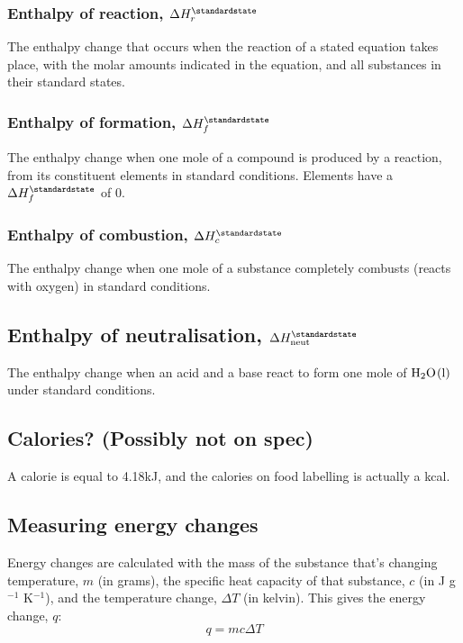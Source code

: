 \subsubsection{Enthalpy of reaction, $\Delta H^{\standardstate}_{r}$}
The enthalpy change that occurs when the reaction of a stated equation takes place, with the molar amounts indicated in the equation, and all substances in their standard states.

\subsubsection{Enthalpy of formation, $\Delta H^{\standardstate}_{f}$}
The enthalpy change when one mole of a compound is produced by a reaction, from its constituent elements in standard conditions. Elements have a $\Delta H^{\standardstate}_{f}$ of 0.

\subsubsection{Enthalpy of combustion, $\Delta H^{\standardstate}_{c}$}
The enthalpy change when one mole of a substance completely combusts (reacts with oxygen) in standard conditions.

\subsection{Enthalpy of neutralisation, $\Delta H^{\standardstate}_{\textrm{neut}}$}
The enthalpy change when an acid and a base react to form one mole of $\ce{H2O(l)}$ under standard conditions.

\subsection{Calories? (Possibly not on spec)}
A calorie is equal to 4.18kJ, and the calories on food labelling is actually a kcal.

\subsection{Measuring energy changes}
Energy changes are calculated with the mass of the substance that's changing temperature, $m$ (in grams), the specific heat capacity of that substance, $c$ (in J g$^{-1}$ K$^{-1}$), and the temperature change, $\Delta T$ (in kelvin). This gives the energy change, $q$:
\begin{equation}
	q=mc\Delta T
\end{equation}

